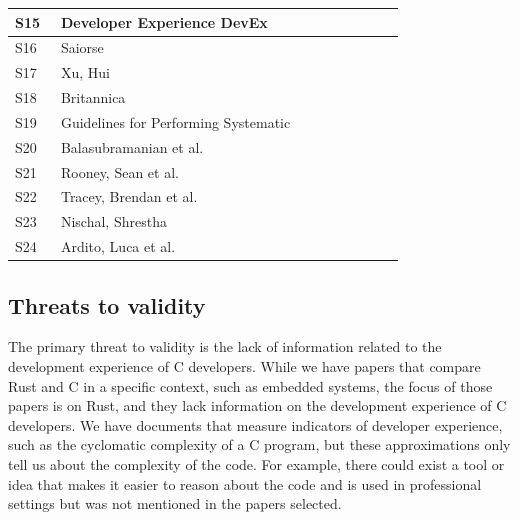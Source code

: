 \documentclass[conference]{IEEEtran}
\begin{document}
\begin{table}[!htbp]
\begin{tabular}{p{0.1\linewidth}p{0.65\linewidth}p{0.1\linewidth}}
        S15 & Developer Experience DevEx           & \cite{DeveloperExperienceDevEx}                             \\\hline
        S16 & Saiorse                              & \cite{saoirseWhyAsyncRust2023}                              \\\hline
        S17 & Xu, Hui                              & \cite{xuMemorySafetyChallengeConsidered2021}                \\\hline
        S18 & Britannica                           & \cite{SystemsProgrammingDefinition}                         \\\hline
        S19 & Guidelines for Performing Systematic & \cite{GuidelinesPerformingSystematic}                       \\\hline
        S20 & Balasubramanian et al.               & \cite{balasubramanianSystemProgrammingRust2017}             \\\hline
        S21 & Rooney, Sean et al.                  & \cite{rooneyEvaluatingFFTPerformance2023}                   \\\hline
        S22 & Tracey, Brendan et al.               & \cite{traceyGradingCurveHow2023}                            \\\hline
        S23 & Nischal, Shrestha                    & \cite{shresthaHereWeGo2020}                                 \\\hline
        S24 & Ardito, Luca et al.                  & \cite{arditoEvaluationRustCode2021}                         \\\hline

    \end{tabular}
\end{table}
\subsection{Threats to validity}

The primary threat to validity is the lack of information related to the development experience of C developers. While we have papers that compare Rust and C in a specific context, such as embedded systems, the focus of those papers is on Rust, and they lack information on the development experience of C developers. We have documents that measure indicators of developer experience, such as the cyclomatic complexity
of a C program, but these approximations only tell us about the complexity of the code. For example, there could exist a tool or idea that makes it easier to reason about the code and is used in professional settings but was not mentioned in the papers selected.
\end{document}
